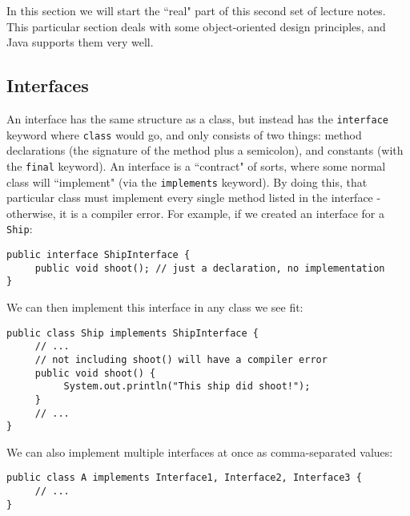 %
In this section we will start the ``real" part of this second set of lecture notes. This particular section deals with some object-oriented design principles, and Java supports them very well.

\subsection{Interfaces}
An interface has the same structure as a class, but instead has the \verb|interface| keyword where \verb|class| would go, and only consists of two things: method declarations (the signature of the method plus a semicolon), and constants (with the \verb|final| keyword). An interface is a ``contract" of sorts, where some normal class will ``implement" (via the \verb|implements| keyword). By doing this, that particular class must implement every single method listed in the interface - otherwise, it is a compiler error. For example, if we created an interface for a \verb|Ship|:
\begin{lstlisting}
public interface ShipInterface {
     public void shoot(); // just a declaration, no implementation
}
\end{lstlisting}
We can then implement this interface in any class we see fit:
\begin{lstlisting}
public class Ship implements ShipInterface {
     // ...
     // not including shoot() will have a compiler error
     public void shoot() {
          System.out.println("This ship did shoot!");
     }
     // ...
}
\end{lstlisting}
We can also implement multiple interfaces at once as comma-separated values:
\begin{lstlisting}
public class A implements Interface1, Interface2, Interface3 {
     // ...
}
\end{lstlisting}

